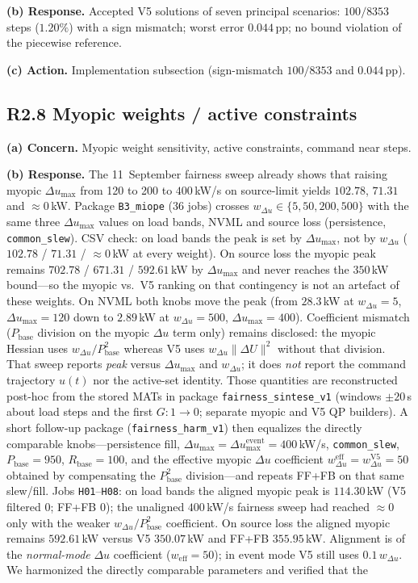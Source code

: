 \documentclass[11pt]{article}
\begin{document}
\textbf{(b) Response.} Accepted V5 solutions of seven principal scenarios: $100/8353$ steps ($1.20\%$) with a sign mismatch; worst error $0.044$\,pp; no bound violation of the piecewise reference.

\textbf{(c) Action.} Implementation subsection (sign-mismatch $100/8353$ and $0.044$\,pp).

\subsection*{R2.8 Myopic weights / active constraints}
\textbf{(a) Concern.} Myopic weight sensitivity, active constraints, command near steps.

\textbf{(b) Response.} The 11~September fairness sweep already shows that raising myopic $\Delta u_{\max}$ from 120 to 200 to $400$\,kW/s on source-limit yields $102.78$, $71.31$ and $\approx 0$\,kW. Package \texttt{B3\_miope} (36 jobs) crosses $w_{\Delta u}\in\{5,50,200,500\}$ with the same three $\Delta u_{\max}$ values on load bands, NVML and source loss (persistence, \texttt{common\_slew}). CSV check: on load bands the peak is set by $\Delta u_{\max}$, not by $w_{\Delta u}$ ($102.78$ / $71.31$ / $\approx 0$\,kW at every weight). On source loss the myopic peak remains $702.78$ / $671.31$ / $592.61$\,kW by $\Delta u_{\max}$ and never reaches the $350$\,kW bound---so the myopic vs.\ V5 ranking on that contingency is not an artefact of these weights. On NVML both knobs move the peak (from $28.3$\,kW at $w_{\Delta u}{=}5$, $\Delta u_{\max}{=}120$ down to $2.89$\,kW at $w_{\Delta u}{=}500$, $\Delta u_{\max}{=}400$). Coefficient mismatch ($P_{\mathrm{base}}$ division on the myopic $\Delta u$ term only) remains disclosed: the myopic Hessian uses $w_{\Delta u}/P_{\mathrm{base}}^2$ whereas V5 uses $w_{\Delta u}\|\Delta U\|^2$ without that division. That sweep reports \emph{peak} versus $\Delta u_{\max}$ and $w_{\Delta u}$; it does \emph{not} report the command trajectory $u(t)$ nor the active-set identity. Those quantities are reconstructed post-hoc from the stored MATs in package \texttt{fairness\_sintese\_v1} (windows $\pm 20$\,s about load steps and the first $G{:}1\to 0$; separate myopic and V5 QP builders). A short follow-up package (\texttt{fairness\_harm\_v1}) then equalizes the directly comparable knobs---persistence fill, $\Delta u_{\max}=\Delta u_{\max}^{\mathrm{event}}=400$\,kW/s, \texttt{common\_slew}, $P_{\mathrm{base}}=950$, $R_{\mathrm{base}}=100$, and the effective myopic $\Delta u$ coefficient $w_{\Delta u}^{\mathrm{eff}}=w_{\Delta u}^{\mathrm{V5}}=50$ obtained by compensating the $P_{\mathrm{base}}^2$ division---and repeats FF+FB on that same slew/fill. Jobs \texttt{H01}--\texttt{H08}: on load bands the aligned myopic peak is $114.30$\,kW (V5 filtered $0$; FF+FB $0$); the unaligned $400$\,kW/s fairness sweep had reached $\approx 0$ only with the weaker $w_{\Delta u}/P_{\mathrm{base}}^2$ coefficient. On source loss the aligned myopic remains $592.61$\,kW versus V5 $350.07$\,kW and FF+FB $355.95$\,kW. Alignment is of the \emph{normal-mode} $\Delta u$ coefficient ($w_{\mathrm{eff}}=50$); in event mode V5 still uses $0.1\,w_{\Delta u}$. We harmonized the directly comparable parameters and verified that the 
\end{document}

